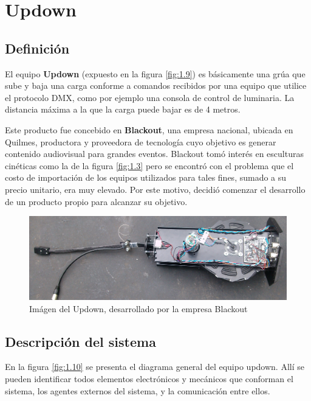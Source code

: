 \section{Updown} \label{sec:\thesection}
\subsection{Definición}
El equipo \textbf{Updown} (expuesto en la figura \ref{fig:1.9}) es básicamente una grúa que sube y baja una carga conforme a comandos recibidos por una equipo que utilice el protocolo DMX, como por ejemplo una consola de control de luminaria. La distancia máxima a la que la carga puede bajar es de 4 metros.

Este producto fue concebido en \textbf{Blackout}, una empresa nacional, ubicada en Quilmes, productora y proveedora de tecnología cuyo objetivo es generar contenido audiovisual para grandes eventos. Blackout tomó interés en esculturas cinéticas como la de la figura \ref{fig:1.3} pero se encontró con el problema que el costo de importación de los equipos utilizados para tales fines, sumado a su precio unitario, era muy elevado. Por este motivo, decidió comenzar el desarrollo de un producto propio para alcanzar su objetivo.\\

\begin{figure}[!ht]
	\centering
	\includegraphics[width=15cm,scale=1]{resources/1_9-updown.jpg}
	\caption{Imágen del Updown, desarrollado por la empresa Blackout}
	\label{fig:\thefigure}
\end{figure}
\newpage
\subsection{Descripción del sistema}

En la figura \ref{fig:1.10} se presenta el diagrama general del equipo updown. Allí se pueden identificar todos elementos electrónicos y mecánicos que conforman el sistema, los agentes externos del sistema, y la comunicación entre ellos.

